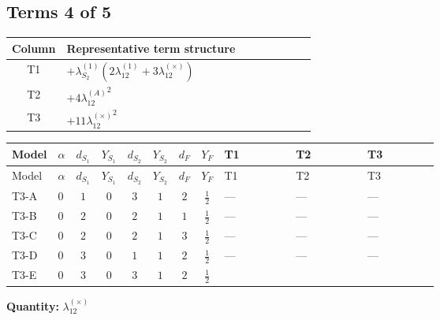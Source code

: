 \documentclass[8pt]{article}
\begin{document}
\begin{landscape}
\subsection*{Terms 4 of 5}
\begin{center}
\begin{tabular}{@{}c >{\raggedright\arraybackslash}p{0.82\linewidth}@{}}
\toprule
Column & Representative term structure \\
\midrule
T1 & \(\displaystyle +{\lambda_{S_2}^{(1)}} (2 {\lambda_{12}^{(1)}}+3 {\lambda_{12}^{(\times)}})\) \\
\midrule
T2 & \(\displaystyle +4 {\lambda_{12}^{(A)}}^2\) \\
\midrule
T3 & \(\displaystyle +11 {\lambda_{12}^{(\times)}}^2\) \\
\midrule
\bottomrule
\end{tabular}
\end{center}
\smallskip
\tiny
\begin{longtable}{@{}llcccccc >{\raggedright\arraybackslash}p{0.21\linewidth} >{\raggedright\arraybackslash}p{0.21\linewidth} >{\raggedright\arraybackslash}p{0.21\linewidth}@{}}
\toprule
Model & $\alpha$ & $d_{S_1}$ & $Y_{S_1}$ & $d_{S_2}$ & $Y_{S_2}$ & $d_F$ & $Y_F$ & T1 & T2 & T3 \\
\midrule
\endfirsthead
\toprule
Model & $\alpha$ & $d_{S_1}$ & $Y_{S_1}$ & $d_{S_2}$ & $Y_{S_2}$ & $d_F$ & $Y_F$ & T1 & T2 & T3 \\
\midrule
\endhead
T3-A & $0$ & $1$ & $0$ & $3$ & $1$ & $2$ & $\frac{1}{2}$ & --- & --- & --- \\
\midrule
T3-B & $0$ & $2$ & $0$ & $2$ & $1$ & $1$ & $\frac{1}{2}$ & --- & --- & --- \\
\midrule
T3-C & $0$ & $2$ & $0$ & $2$ & $1$ & $3$ & $\frac{1}{2}$ & --- & --- & --- \\
\midrule
T3-D & $0$ & $3$ & $0$ & $1$ & $1$ & $2$ & $\frac{1}{2}$ & --- & --- & --- \\
\midrule
T3-E & $0$ & $3$ & $0$ & $3$ & $1$ & $2$ & $\frac{1}{2}$ & \scriptsize\adjustbox{max width=\linewidth}{$\begin{gathered} +{\lambda_{S_2}^{(1)}} (2 {\lambda_{12}^{(1)}}+3 {\lambda_{12}^{(\times)}})\end{gathered}$} & \scriptsize\adjustbox{max width=\linewidth}{$\begin{gathered} +4 {\lambda_{12}^{(A)}}^2\end{gathered}$} & \scriptsize\adjustbox{max width=\linewidth}{$\begin{gathered} +11 {\lambda_{12}^{(\times)}}^2\end{gathered}$} \\
\midrule
\bottomrule
\end{longtable}
\clearpage
\noindent\textbf{Quantity: }$\lambda_{12}^{(\times)}$\par\smallskip

\end{landscape}
\end{document}
